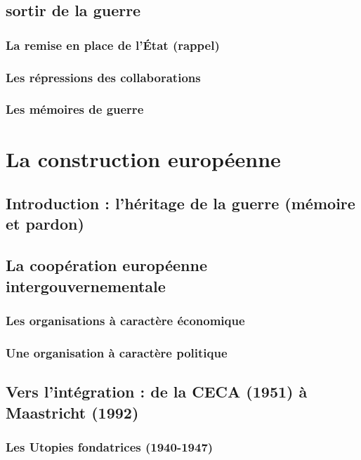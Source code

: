 \documentclass[12pt]{report}
\begin{document}
\section{sortir de la guerre}

\subsection{La remise en place de l'État (rappel)}

\subsection{Les répressions des collaborations}

\subsection{Les mémoires de guerre}


\chapter{La construction européenne}

\section*{Introduction : l'héritage de la guerre (mémoire et pardon)}

\section{La coopération européenne intergouvernementale}

\subsection{Les organisations à caractère économique}

\subsection{Une organisation à caractère politique}

\section{Vers l'intégration : de la CECA (1951) à Maastricht (1992)}

\subsection{Les Utopies fondatrices (1940-1947)}
\end{document}
